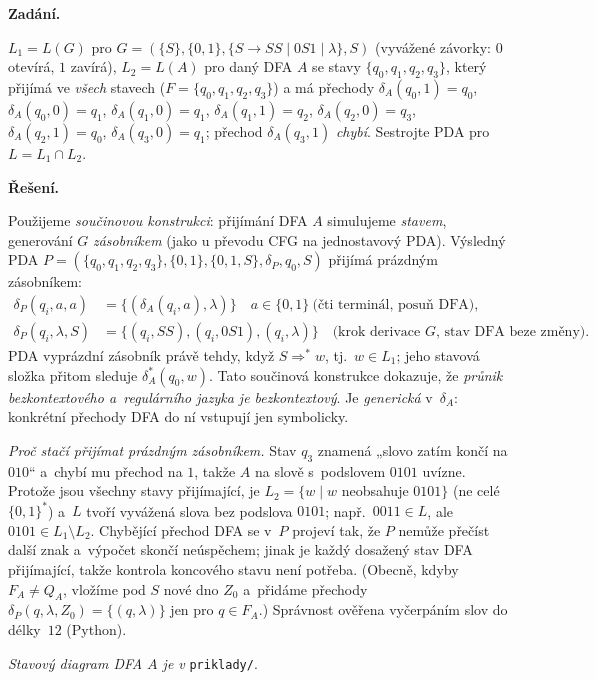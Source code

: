 \documentclass[11pt,a4paper]{article}
\begin{document}
\begin{priklad}
\par
\textbf{Zadání.}\par
$L_1=L(G)$ pro $G=(\{S\},\{0,1\},\{S\to SS\mid 0S1\mid\lambda\},S)$ (vyvážené závorky: $0$ otevírá, $1$ zavírá), $L_2=L(A)$ pro daný DFA $A$ se stavy $\{q_0,q_1,q_2,q_3\}$, který přijímá ve \emph{všech} stavech ($F=\{q_0,q_1,q_2,q_3\}$) a má přechody $\delta_A(q_0,1)=q_0$, $\delta_A(q_0,0)=q_1$, $\delta_A(q_1,0)=q_1$, $\delta_A(q_1,1)=q_2$, $\delta_A(q_2,0)=q_3$, $\delta_A(q_2,1)=q_0$, $\delta_A(q_3,0)=q_1$; přechod $\delta_A(q_3,1)$ \emph{chybí}. Sestrojte PDA pro $L=L_1\cap L_2$.

\smallskip
\textbf{Řešení.}\par
Použijeme \emph{součinovou konstrukci}: přijímání DFA $A$ simulujeme \emph{stavem}, generování $G$ \emph{zásobníkem} (jako u převodu CFG na jednostavový PDA). Výsledný PDA $P=(\{q_0,q_1,q_2,q_3\},\{0,1\},\{0,1,S\},\delta_P,q_0,S)$ přijímá prázdným zásobníkem:
\[
\begin{aligned}
\delta_P(q_i,a,a)&=\{(\delta_A(q_i,a),\lambda)\}\quad a\in\{0,1\}\ \text{(čti terminál, posuň DFA)},\\
\delta_P(q_i,\lambda,S)&=\{(q_i,SS),(q_i,0S1),(q_i,\lambda)\}\quad\text{(krok derivace $G$, stav DFA beze změny)}.
\end{aligned}
\]
PDA vyprázdní zásobník právě tehdy, když $S\Rightarrow^* w$, tj.\ $w\in L_1$; jeho stavová složka přitom sleduje $\delta_A^*(q_0,w)$. Tato součinová konstrukce dokazuje, že \emph{průnik bezkontextového a~regulárního jazyka je bezkontextový}. Je \emph{generická} v~$\delta_A$: konkrétní přechody DFA do ní vstupují jen symbolicky.

\emph{Proč stačí přijímat prázdným zásobníkem.} Stav $q_3$ znamená „slovo zatím končí na $010$`` a~chybí mu přechod na $1$, takže $A$ na slově s~podslovem $0101$ uvízne. Protože jsou všechny stavy přijímající, je $L_2=\{w\mid w$ neobsahuje $0101\}$ (ne celé $\{0,1\}^*$) a~$L$ tvoří vyvážená slova bez podslova $0101$; např.\ $0011\in L$, ale $0101\in L_1\setminus L_2$. Chybějící přechod DFA se v~$P$ projeví tak, že $P$ nemůže přečíst další znak a~výpočet skončí neúspěchem; jinak je každý dosažený stav DFA přijímající, takže kontrola koncového stavu není potřeba. (Obecně, kdyby $F_A\neq Q_A$, vložíme pod $S$ nové dno $Z_0$ a~přidáme přechody $\delta_P(q,\lambda,Z_0)=\{(q,\lambda)\}$ jen pro $q\in F_A$.) Správnost ověřena vyčerpáním slov do délky~$12$ (Python).\par
\emph{Stavový diagram DFA $A$ je v} \texttt{priklady/}.
\end{priklad}
\end{document}
